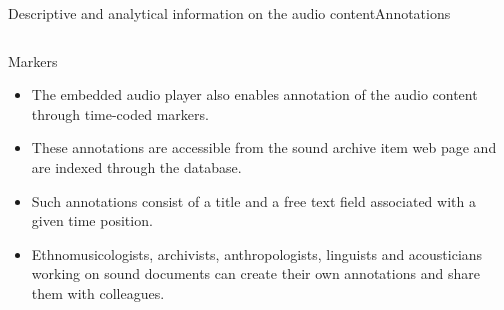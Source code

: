 \documentclass[final, hyperref, table]{beamer}
\begin{document}
\begin{frame}{Descriptive and analytical information on the audio content}{Annotations}\scriptsize
  \begin{columns}[T]
    \begin{column}{0.6\textwidth}
      \begin{block}{Markers}%
        \begin{itemize}
        \item The embedded audio player also enables annotation of the
          audio content through time-coded markers.
             \item These annotations are accessible from the sound archive
          item web page and are indexed through the database.

\item Such annotations consist of a title and a free text
          field associated with a given time position.
   
     \item Ethnomusicologists, archivists, anthropologists,
          linguists and acousticians working on sound documents can
          create their own annotations and share them with colleagues.
   
        \end{itemize}

      \end{block}
    \end{column}


\end{columns}
\end{frame}
\end{document}
